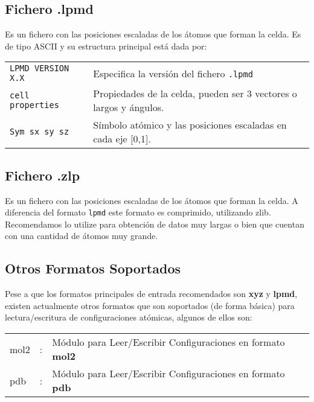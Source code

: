 \subsection{Fichero .lpmd}

Es un fichero con las posiciones escaladas de los \'atomos que forman la celda. Es de tipo ASCII y su estructura principal est\'a dada por:

\begin{center}
 \begin{tabular}{l|l}
 \verb|LPMD VERSION X.X | & Especifica la versi\'on del fichero \verb|.lpmd| \\
 \verb|cell properties | & Propiedades de la celda, pueden ser 3 vectores o largos y \'angulos. \\
 \verb|Sym sx sy sz| & S\'imbolo at\'omico y las posiciones escaladas en cada eje [0,1].\\
\end{tabular}
\end{center}

\subsection{Fichero .zlp}

Es un fichero con las posiciones escaladas de los \'atomos que forman la celda. A diferencia del formato \verb|lpmd| este formato es comprimido, utilizando zlib. Recomendamos lo utilize para obtenci\'on de datos muy largas o bien que cuentan con una cantidad de \'atomos muy grande.

\subsection{Otros Formatos Soportados}

Pese a que los formatos principales de entrada recomendados son \textbf{xyz} y \textbf{lpmd}, existen actualmente otros formatos que son soportados (de forma b\'asica) para lectura/escritura de configuraciones at\'omicas, algunos de ellos son:

\begin{tabular}{lcl}\\
 mol2 &:& M\'odulo para Leer/Escribir Configuraciones en formato \textbf{mol2} \\
 pdb  &:& M\'odulo para Leer/Escribir Configuraciones en formato \textbf{pdb} \\
\end{tabular}




